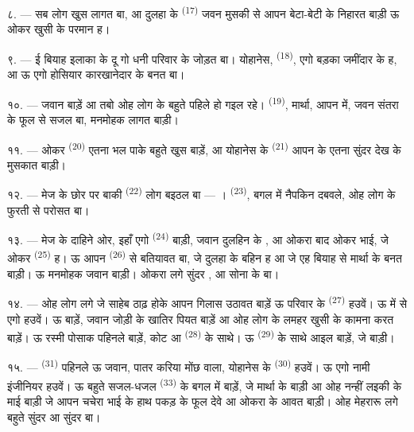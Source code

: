 \VUsaut{3.0mm}

८. --- सब लोग खुस लागत बा, आ दुलहा के  \textsuperscript{(17)}
जवन मुसकी से आपन बेटा-बेटी के निहारत बाड़ी ऊ ओकर खुसी के परमान ह।

९. --- ई बियाह इलाका के दू गो धनी परिवार के जोड़त बा। योहानेस,
 \textsuperscript{(18)}, एगो बड़का जमींदार के 
ह, आ ऊ एगो होसियार कारखानेदार के  बनत बा।

१०. ---  जवान बाड़ें आ तबो ओह लोग के 
बहुते पहिले हो गइल रहे।  \textsuperscript{(19)},
मार्था, आपन  में, जवन संतरा के फूल से सजल बा,
मनमोहक लागत बाड़ी।

११. --- ओकर  \textsuperscript{(20)} एतना भल 
पाके बहुते खुस बाड़ें, आ योहानेस के  \textsuperscript{(21)}
आपन  के एतना सुंदर देख के मुसकात बाड़ी।

१२. --- मेज के छोर पर बाकी  \textsuperscript{(22)} लोग
बइठल बा — ।
 \textsuperscript{(23)}, बगल में नैपकिन दबवले, ओह
लोग के फुरती से परोसत बा।

\VUsaut{3.0mm}

१३. --- मेज के दाहिने ओर, इहाँ एगो 
\textsuperscript{(24)} बाड़ी, जवान दुलहिन के , आ ओकरा बाद
ओकर भाई, जे ओकर  \textsuperscript{(25)} ह। ऊ आपन
 \textsuperscript{(26)} से बतियावत बा, जे दुलहा के
बहिन ह आ जे एह बियाह से मार्था के  बनत बाड़ी। ऊ मनमोहक
जवान बाड़ी। ओकरा लगे सुंदर ,  आ सोना
के  बा।

१४. --- ओह लोग लगे जे साहेब ठाढ़ होके आपन गिलास उठावत बाड़ें ऊ परिवार
के  \textsuperscript{(27)} हउवें। ऊ 
में से एगो हउवें। ऊ  बाड़ें, जवान जोड़ी के
 खातिर पियत बाड़ें आ ओह लोग के लमहर खुसी के कामना करत
बाड़ें। ऊ रस्मी पोसाक पहिनले बाड़ें, कोट आ 
\textsuperscript{(28)} के साथे। ऊ  \textsuperscript{(29)} के
साथे आइल बाड़ें, जे  बाड़ी।

१५. ---  \textsuperscript{(31)} पहिनले ऊ जवान, पातर करिया
मोंछ वाला, योहानेस के  \textsuperscript{(30)} हउवें। ऊ एगो
नामी इंजीनियर हउवें। ऊ बहुते सजल-धजल 
\textsuperscript{(33)} के बगल में बाड़ें, जे मार्था के  बाड़ी आ ओह नन्हीं लइकी के माई बाड़ी जे आपन चचेरा भाई के हाथ पकड़
के फूल देवे आ ओकरा के   आवत बाड़ी। ओह
मेहरारू लगे बहुते सुंदर  आ सुंदर 
बा।

